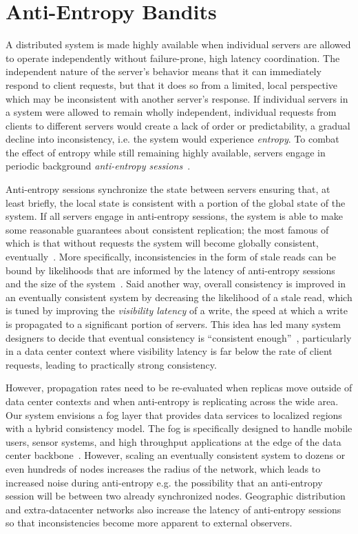 \section{Anti-Entropy Bandits}
\label{ch06_anti_entropy_bandits}

A distributed system is made highly available when individual servers are
allowed to operate independently without failure-prone, high latency
coordination.
The independent nature of the server's behavior means that it can immediately
respond to client requests, but that it does so from a limited, local
perspective which may be inconsistent with another server's response.
If individual servers in a system were allowed to remain wholly independent,
individual requests from clients to different servers would create a lack of
order or predictability, a gradual decline into inconsistency, i.e. the
system would experience \textit{entropy}.
To combat the effect of entropy while still remaining highly available,
servers engage in periodic background \textit{anti-entropy
  sessions}~\cite{bayou}.

Anti-entropy sessions synchronize the state between servers ensuring that,
at least briefly, the local state is consistent with a portion of the global
state of the system.
If all servers engage in anti-entropy sessions, the system is able to make
some reasonable guarantees about consistent replication; the most famous
of which is that without requests the system will become
globally consistent, eventually~\cite{anti_entropy}.
More specifically, inconsistencies in the form of stale reads can be bound by
likelihoods that are informed by the latency of anti-entropy sessions and the
size of the system~\cite{probabilistically_bounded_staleness,quantifying_pbs}.
Said another way, overall consistency is improved in an eventually consistent
system by decreasing the likelihood of a stale read, which is tuned by
improving the \textit{visibility latency} of a write, the speed at which a
write is propagated to a significant portion of servers.
This idea has led many system designers to decide that eventual consistency
is ``consistent enough''~\cite{bermbach_eventual_2011,wada_data_2011},
particularly in a data center context where visibility latency is far below
the rate of client requests, leading to practically strong consistency.

However, propagation rates need to be re-evaluated when replicas move outside of data center contexts and when anti-entropy is replicating across the wide area.
Our system envisions a fog layer that provides data services to localized regions with a hybrid consistency model.
The fog is specifically designed to handle mobile users, sensor systems, and high throughput applications at the edge of the data center backbone~\cite{edge_computing,geo_cdn}.
However, scaling an eventually consistent system to dozens or even hundreds
of nodes increases the radius of the network, which leads to increased noise
during anti-entropy e.g. the possibility that an anti-entropy session will be
between two already synchronized nodes.
Geographic distribution and extra-datacenter networks also increase the
latency of anti-entropy sessions so that inconsistencies become more apparent
to external observers.

